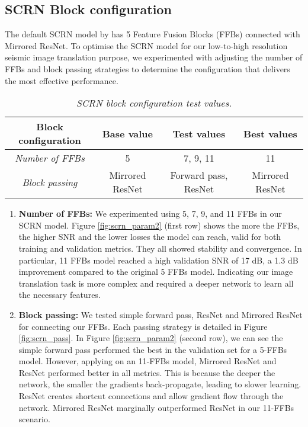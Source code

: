 \subsection{SCRN Block configuration} \label{subsec:block_config}
The default SCRN model by  has 5 Feature Fusion Blocks (FFBs) connected with Mirrored ResNet. To optimise the SCRN model for our low-to-high resolution seismic image translation purpose, we experimented with adjusting the number of FFBs and block passing strategies to determine the configuration that delivers the most effective performance.

\begin{table}[ht]
	\centering
	\begin{tabular}{cccc}
		\hline
		\textbf{Block configuration} & \textbf{Base value} & \textbf{Test values} & \textbf{Best values} \\
		\hline
		\textit{Number of FFBs} & 5 & 7, 9, 11 & 11\\
		\textit{Block passing} & Mirrored ResNet & Forward pass, ResNet & Mirrored ResNet\\
		\hline
	\end{tabular}
	\caption{\textit{SCRN block configuration test values.}}
	\label{tab:scrn_block_config}
\end{table}

\begin{enumerate}
	\item \textbf{Number of FFBs:} We experimented using 5, 7, 9, and 11 FFBs in our SCRN model. Figure \ref{fig:scrn_param2} (first row) shows the more the FFBs, the higher SNR and the lower losses the model can reach, valid for both training and validation metrics. They all showed stability and convergence. In particular, 11 FFBs model reached a high validation SNR of 17 dB, a 1.3 dB improvement compared to the original 5 FFBs model. Indicating our image translation task is more complex and required a deeper network to learn all the necessary features.
	
	\item \textbf{Block passing:} We tested simple forward pass, ResNet and Mirrored ResNet for connecting our FFBs. Each passing strategy is detailed in Figure \ref{fig:scrn_pass}. In Figure \ref{fig:scrn_param2} (second row), we can see the simple forward pass performed the best in the validation set for a 5-FFBs model. However, applying on an 11-FFBs model, Mirrored ResNet and ResNet performed better in all metrics. This is because the deeper the network, the smaller the gradients back-propagate, leading to slower learning. ResNet creates shortcut connections and allow gradient flow through the network. Mirrored ResNet marginally outperformed ResNet in our 11-FFBs scenario.
\end{enumerate}

